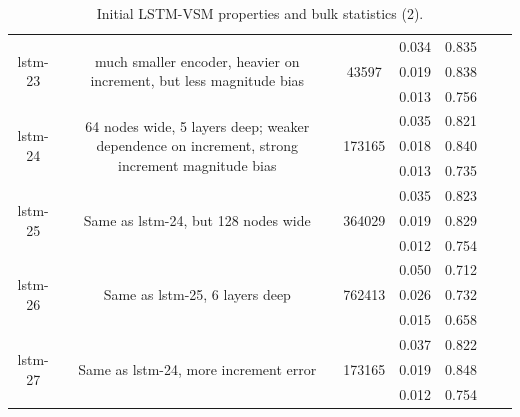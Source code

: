 \begin{table}[h!p]
\begin{sideways}
\begin{tabular}{c|c|c|c|c|c|c }
\hline
\multirow{3}{6em}{lstm-23} & \multirow{3}{16em}{much smaller encoder, heavier on increment, but less magnitude bias} & \multirow{3}{4em}{43597} & 0.034 & 0.835 &  &  \\ & & & 0.019 & 0.838 &  &  \\ & & & 0.013 & 0.756 &  &  \\
\hline
\multirow{3}{6em}{lstm-24} & \multirow{3}{16em}{64 nodes wide, 5 layers deep; weaker dependence on increment, strong increment magnitude bias} & \multirow{3}{4em}{173165} & 0.035 & 0.821 &  &  \\ & & & 0.018 & 0.840 &  &  \\ & & & 0.013 & 0.735 &  &  \\
\hline
\multirow{3}{6em}{lstm-25} & \multirow{3}{16em}{Same as lstm-24, but 128 nodes wide} & \multirow{3}{4em}{364029} & 0.035 & 0.823 &  &  \\ & & & 0.019 & 0.829 &  &  \\ & & & 0.012 & 0.754 &  &  \\
\hline
\multirow{3}{6em}{lstm-26} & \multirow{3}{16em}{Same as lstm-25, 6 layers deep} & \multirow{3}{4em}{762413} & 0.050 & 0.712 &  &  \\ & & & 0.026 & 0.732 &  &  \\ & & & 0.015 & 0.658 &  &  \\
\hline
\multirow{3}{6em}{lstm-27} & \multirow{3}{16em}{Same as lstm-24, more increment error} & \multirow{3}{4em}{173165} & 0.037 & 0.822 &  &  \\ & & & 0.019 & 0.848 &  &  \\ & & & 0.012 & 0.754 &  &  \\
    \end{tabular}
\end{sideways}
    \caption{Initial LSTM-VSM properties and bulk statistics (2).}
    \label{model-init-lstm-table-2}
\end{table}

